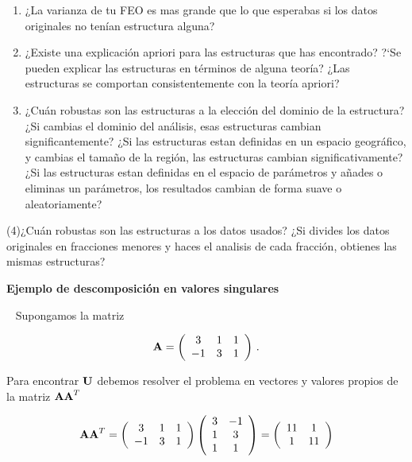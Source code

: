 \documentclass[
]{agujournal2019}
\begin{document}
\begin{enumerate}
\def\labelenumi{(\arabic{enumi})}
\item
  ¿La varianza de tu FEO es mas grande que lo que esperabas si los datos
  originales no tenían estructura alguna?\\
\item
  ¿Existe una explicación apriori para las estructuras que has
  encontrado? ?{}`Se pueden explicar las estructuras en términos de
  alguna teoría? ¿Las estructuras se comportan consistentemente con la
  teoría apriori?\\
\item
  ¿Cuán robustas son las estructuras a la elección del dominio de la
  estructura? ¿Si cambias el dominio del análisis, esas estructuras
  cambian significantemente? ¿Si las estructuras estan definidas en un
  espacio geográfico, y cambias el tamaño de la región, las estructuras
  cambian significativamente? ¿Si las estructuras estan definidas en el
  espacio de parámetros y añades o eliminas un parámetros, los
  resultados cambian de forma suave o aleatoriamente?\\
\end{enumerate}

(4)¿Cuán robustas son las estructuras a los datos usados? ¿Si divides
los datos originales en fracciones menores y haces el analisis de cada
fracción, obtienes las mismas estructuras?

\vspace{0.5cm}

\textbf{Ejemplo de descomposición en valores singulares}

~ Supongamos la matriz

\[{\textbf A}=\left(\begin{array}{ccc}
  3 & 1 & 1\\
  -1 & 3 & 1\\
      \end{array}\right)\,.\]

Para encontrar \({\textbf U}\) debemos resolver el problema en vectores
y valores propios de la matriz \({\textbf A}{\textbf A}^T\)

\[{\textbf A}{\textbf A}^T=\left(\begin{array}{ccc}
  3 & 1 & 1\\
  -1 & 3 & 1\\
      \end{array}\right)
      \left(\begin{array}{ccc}
  3 & -1 \\
  1 & 3 \\
  1 & 1 \\
      \end{array}\right)=\left(\begin{array}{cc}
  11 & 1 \\
  1 & 11 \\
      \end{array}\right)\]
\end{document}
